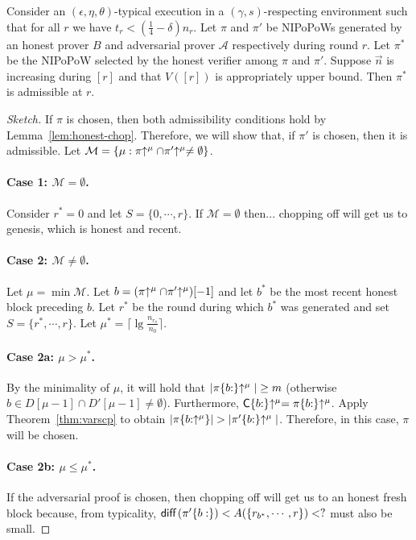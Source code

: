 \begin{theorem}\label{thm:admissibility}
  Consider an $(\epsilon, \eta, \theta)$-typical execution in a
  $(\gamma, s)$-respecting environment such that for all $r$ we have
  $t_r < (\frac{1}{4} - \delta)n_r$.
  Let $\pi$ and $\pi'$ be NIPoPoWs generated by an honest prover $B$
  and adversarial prover $\mathcal{A}$ respectively during round $r$. Let
  $\pi^*$ be the NIPoPoW selected by the honest verifier among $\pi$
  and $\pi'$. Suppose $\vec{n}$ is increasing during $[r]$ and
  that $V([r])$ is appropriately upper bound.
  Then $\pi^*$ is admissible at $r$.
\end{theorem}
\begin{proof}[Sketch]
  If $\pi$ is chosen, then both admissibility conditions hold by
  Lemma~\ref{lem:honest-chop}.
  Therefore, we will show that, if $\pi'$ is chosen, then it is admissible.
  Let $\mathcal{M} =
  \{\mu: \pi\negthickspace\uparrow^\mu \cap \pi'\negthickspace\uparrow^\mu \neq \emptyset\}$.
  \paragraph{Case 1: $\mathcal{M} = \emptyset$.}
  Consider $r^* = 0$ and let $S = \{0, \cdots, r\}$.
  If $\mathcal{M} = \emptyset$ then... chopping off will get us to genesis,
  which is honest and recent. 
  \paragraph{Case 2: $\mathcal{M} \neq \emptyset$.}
  Let
  $\mu = \min\mathcal{M}$. Let
  $b = (\pi\negthickspace\uparrow^\mu \cap \pi'\negthickspace\uparrow^\mu)[-1]$
  and let $b^*$ be the most recent honest block preceding $b$.
  Let $r^*$ be the round during which $b^*$ was generated
  and set $S = \{r^*, \cdots, r\}$.
  Let $\mu^* = \lceil\lg\frac{n_{r_\pi}}{n_0}\rceil$.
  \paragraph{Case 2a: $\mu > \mu^*$.}
  By the minimality of $\mu$, it will hold that
  $|\pi\{b{:}\}\negthickspace\uparrow^\mu| \geq m$ (otherwise
  $b \in D[\mu - 1] \cap D'[\mu - 1] \neq \emptyset$).
  Furthermore, $\mathsf{C}\{b{:}\}\negthickspace\uparrow^\mu = \pi\{b{:}\}\negthickspace\uparrow^\mu$.
  Apply Theorem~\ref{thm:varscp} to obtain
  $|\pi\{b{:}\negthickspace\uparrow^\mu\}| > |\pi'\{b{:}\}\negthickspace\uparrow^\mu|$.
  Therefore, in this case, $\pi$ will be chosen.
  \paragraph{Case 2b: $\mu \leq \mu^*$.}
  If the adversarial proof is chosen, then chopping off will get us to an
  honest fresh block because, from typicality,
  $\operatorname{\textsf{diff}\,}(\pi'\{b:\}) < A(\{r_{b^*}, \cdots, r\}) < ?$ must also be small.
\end{proof}

